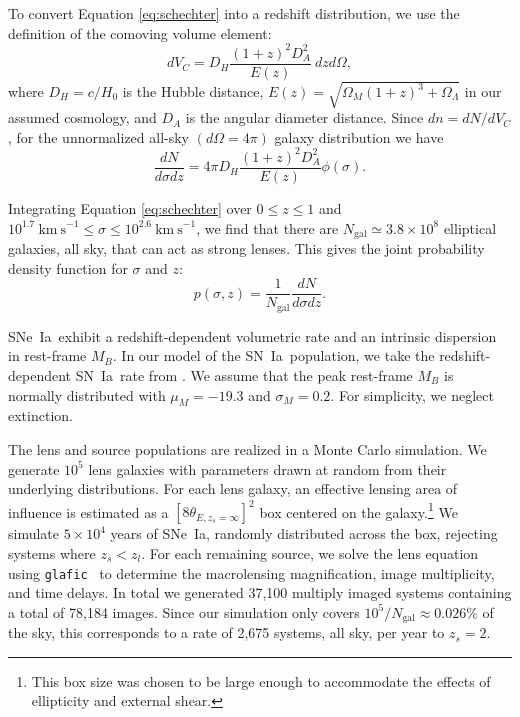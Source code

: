 \documentclass[iop,apj,numberedappendix,twocolappendix]{emulateapj}
\newcommand{\snia}{{\rm SN~Ia}}
\newcommand{\sneia}{{\rm SNe~Ia}}
\newcommand{\q}[1]{{\tt #1}}
\newcommand{\kms}{\ensuremath{\mathrm{km~s}^{-1}}}
\begin{document}
To convert Equation \ref{eq:schechter} into a redshift distribution, we use the definition of the comoving volume element:
\begin{equation}
	dV_C = D_H \frac{(1+z)^2 D_A^2}{E(z)}~dzd\Omega,
\end{equation}
where $D_H = c / H_0$ is the Hubble distance, $E(z) = \sqrt{\Omega_M(1+z)^3 + \Omega_\Lambda}$ in our assumed cosmology, and $D_A$ is the angular diameter distance.
Since $dn = dN/dV_C$, for the unnormalized all-sky $(d\Omega = 4\pi)$ galaxy distribution we have
\begin{equation}
\label{eq:galaxydist}
\frac{dN}{d\sigma dz} =  4\pi D_H \frac{(1+z)^2 D_A^2}{E(z)}\phi(\sigma).
\end{equation}

Integrating Equation \ref{eq:schechter} over $0 \leq z \leq 1$ and $10^{1.7}~\kms \leq \sigma \leq 10^{2.6}~\kms$, we find that there are $N_\mathrm{gal} \simeq 3.8 \times 10^8$ elliptical galaxies, all sky, that can act as strong lenses. 
This gives the joint probability density  function for $\sigma$ and $z$:
\begin{equation}
\label{eq:galaxypdf}
p(\sigma, z) = \frac{1}{N_\mathrm{gal}} \frac{dN}{d\sigma dz}.
\end{equation}

\sneia\ exhibit a redshift-dependent volumetric rate and an intrinsic dispersion in rest-frame $M_B$. 
In our model of the \snia\ population, we take the redshift-dependent \snia\ rate from \cite{2000MNRAS.319..549S}.
We assume that the peak rest-frame $M_B$ is normally distributed with $\mu_M = -19.3$ and $\sigma_M = 0.2$.
For simplicity, we neglect extinction.

The lens and source populations are realized in a Monte Carlo simulation.
We generate $10^5$ lens galaxies with parameters drawn at random from their underlying distributions.
For each lens galaxy, an effective lensing area of influence is estimated as a $[8 \theta_{E, z_s=\infty}]^2$ box centered on the galaxy.\footnote{This box size was chosen to be large enough to accommodate the effects of ellipticity and external shear.}
We simulate $5 \times 10^4$ years of \sneia, randomly distributed across the box, rejecting systems where $z_s < z_l$.
For each remaining source, we solve the lens equation using  \q{glafic}\  \citep{glafic} to determine the macrolensing magnification, image multiplicity, and time delays.
In total we generated 37,100 multiply imaged systems containing a total of 78,184 images.
Since our simulation only covers $10^5 / N_\mathrm{gal} \approx 0.026\%$ of the sky, this  corresponds to a rate of 2,675 systems, all sky, per year to $z_s=2$. 
\end{document}
